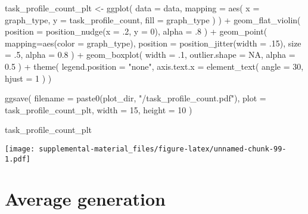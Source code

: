 \documentclass[
]{book}
\newenvironment{Shaded}{\begin{snugshade}}{\end{snugshade}}
\newcommand{\AttributeTok}[1]{\textcolor[rgb]{0.77,0.63,0.00}{#1}}
\newcommand{\ConstantTok}[1]{\textcolor[rgb]{0.00,0.00,0.00}{#1}}
\newcommand{\DecValTok}[1]{\textcolor[rgb]{0.00,0.00,0.81}{#1}}
\newcommand{\FloatTok}[1]{\textcolor[rgb]{0.00,0.00,0.81}{#1}}
\newcommand{\FunctionTok}[1]{\textcolor[rgb]{0.00,0.00,0.00}{#1}}
\newcommand{\NormalTok}[1]{#1}
\newcommand{\OtherTok}[1]{\textcolor[rgb]{0.56,0.35,0.01}{#1}}
\newcommand{\SpecialCharTok}[1]{\textcolor[rgb]{0.00,0.00,0.00}{#1}}
\newcommand{\StringTok}[1]{\textcolor[rgb]{0.31,0.60,0.02}{#1}}
\begin{document}
\begin{Shaded}
\begin{Highlighting}[]
\NormalTok{task\_profile\_count\_plt }\OtherTok{\textless{}{-}} \FunctionTok{ggplot}\NormalTok{(}
    \AttributeTok{data =}\NormalTok{ data,}
    \AttributeTok{mapping =} \FunctionTok{aes}\NormalTok{(}
      \AttributeTok{x =}\NormalTok{ graph\_type,}
      \AttributeTok{y =}\NormalTok{ task\_profile\_count,}
      \AttributeTok{fill =}\NormalTok{ graph\_type}
\NormalTok{    )}
\NormalTok{  ) }\SpecialCharTok{+}
  \FunctionTok{geom\_flat\_violin}\NormalTok{(}
    \AttributeTok{position =} \FunctionTok{position\_nudge}\NormalTok{(}\AttributeTok{x =}\NormalTok{ .}\DecValTok{2}\NormalTok{, }\AttributeTok{y =} \DecValTok{0}\NormalTok{),}
    \AttributeTok{alpha =}\NormalTok{ .}\DecValTok{8}
\NormalTok{  ) }\SpecialCharTok{+}
  \FunctionTok{geom\_point}\NormalTok{(}
    \AttributeTok{mapping=}\FunctionTok{aes}\NormalTok{(}\AttributeTok{color =}\NormalTok{ graph\_type),}
    \AttributeTok{position =} \FunctionTok{position\_jitter}\NormalTok{(}\AttributeTok{width =}\NormalTok{ .}\DecValTok{15}\NormalTok{),}
    \AttributeTok{size =}\NormalTok{ .}\DecValTok{5}\NormalTok{,}
    \AttributeTok{alpha =} \FloatTok{0.8}
\NormalTok{  ) }\SpecialCharTok{+}
  \FunctionTok{geom\_boxplot}\NormalTok{(}
    \AttributeTok{width =}\NormalTok{ .}\DecValTok{1}\NormalTok{,}
    \AttributeTok{outlier.shape =} \ConstantTok{NA}\NormalTok{,}
    \AttributeTok{alpha =} \FloatTok{0.5}
\NormalTok{  ) }\SpecialCharTok{+}
  \FunctionTok{theme}\NormalTok{(}
    \AttributeTok{legend.position =} \StringTok{"none"}\NormalTok{,}
    \AttributeTok{axis.text.x =} \FunctionTok{element\_text}\NormalTok{(}
      \AttributeTok{angle =} \DecValTok{30}\NormalTok{,}
      \AttributeTok{hjust =} \DecValTok{1}
\NormalTok{    )}
\NormalTok{  )}

\FunctionTok{ggsave}\NormalTok{(}
  \AttributeTok{filename =} \FunctionTok{paste0}\NormalTok{(plot\_dir, }\StringTok{"/task\_profile\_count.pdf"}\NormalTok{),}
  \AttributeTok{plot =}\NormalTok{ task\_profile\_count\_plt,}
  \AttributeTok{width =} \DecValTok{15}\NormalTok{,}
  \AttributeTok{height =} \DecValTok{10}
\NormalTok{)}

\NormalTok{task\_profile\_count\_plt}
\end{Highlighting}
\end{Shaded}

\texttt{[image: supplemental-material\_files/figure-latex/unnamed-chunk-99-1.pdf]}

\hypertarget{average-generation-1}{%
\section{Average generation}\label{average-generation-1}}
\end{document}
